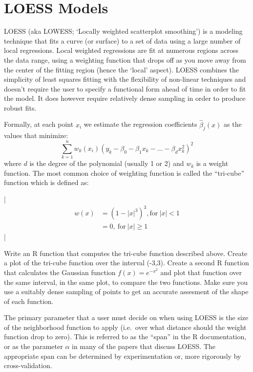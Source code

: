\section{LOESS Models}

LOESS (aka LOWESS; `Locally weighted scatterplot smoothing') is a
modeling technique that fits a curve (or surface) to a set of data using
a large number of local regressions. Local weighted regressions are fit
at numerous regions across the data range, using a weighting function
that drops off as you move away from the center of the fitting region
(hence the `local' aspect). LOESS combines the simplicity of least
squares fitting with the flexibility of non-linear techniques and
doesn't require the user to specify a functional form ahead of time in
order to fit the model. It does however require relatively dense
sampling in order to produce robust fits.

Formally, at each point $x_i$ we estimate the regression coefficients
$\hat{\beta}_j(x)$ as the values that minimize:
\[\sum_{k=1}^n w_k(x_i)(y_k - \beta_0 - \beta_1 x_k - \ldots - \beta_d x_k^2)^2\]
where $d$ is the degree of the polynomial (usually 1 or 2) and $w_k$ is
a weight function. The most common choice of weighting function is
called the ``tri-cube'' function which is defined as:

\lstDeleteShortInline|
\begin{align*}
 w(x) & = (1-|x|^3)^3, \mbox{for}\ |x| < 1  \\
      & = 0,\ \mbox{for}\ |x| \geq 1
\end{align*}
\lstMakeShortInline|


\medskip
\begin{assignment}
Write an R function that computes the tri-cube
function described above. Create a plot of the tri-cube function over
the interval (-3,3). Create a second R function that calculates the
Gaussian function $f(x) = e^{-x^2}$ and plot that function over the same
interval, in the same plot, to compare the two functions.  Make sure you use a suitably dense sampling of points to get an accurate assesment of the shape of each function.
\end{assignment}

The primary parameter that a user must decide on when using LOESS is the
size of the neighborhood function to apply (i.e.~over what distance
should the weight function drop to zero). This is referred to as the
``span'' in the R documentation, or as the parameter $\alpha$ in many of
the papers that discuss LOESS. The appropriate span can be determined by
experimentation or, more rigorously by cross-validation.

